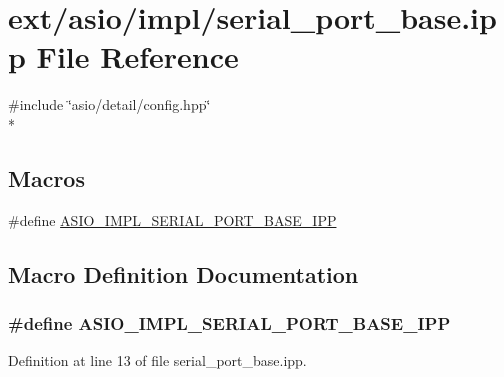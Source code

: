 \hypertarget{serial__port__base_8ipp}{}\section{ext/asio/impl/serial\+\_\+port\+\_\+base.ipp File Reference}
\label{serial__port__base_8ipp}
{\ttfamily \#include \char`\"{}asio/detail/config.\+hpp\char`\"{}}\\*
\subsection*{Macros}
\begin{DoxyCompactItemize}
\item 
\#define \hyperlink{serial__port__base_8ipp_ab15a9cac1d9640d965cf88420ea059c4}{A\+S\+I\+O\+\_\+\+I\+M\+P\+L\+\_\+\+S\+E\+R\+I\+A\+L\+\_\+\+P\+O\+R\+T\+\_\+\+B\+A\+S\+E\+\_\+\+I\+P\+P}
\end{DoxyCompactItemize}


\subsection{Macro Definition Documentation}
\hypertarget{serial__port__base_8ipp_ab15a9cac1d9640d965cf88420ea059c4}{}
\subsubsection[{A\+S\+I\+O\+\_\+\+I\+M\+P\+L\+\_\+\+S\+E\+R\+I\+A\+L\+\_\+\+P\+O\+R\+T\+\_\+\+B\+A\+S\+E\+\_\+\+I\+P\+P}]{\setlength{\rightskip}{0pt plus 5cm}\#define A\+S\+I\+O\+\_\+\+I\+M\+P\+L\+\_\+\+S\+E\+R\+I\+A\+L\+\_\+\+P\+O\+R\+T\+\_\+\+B\+A\+S\+E\+\_\+\+I\+P\+P}\label{serial__port__base_8ipp_ab15a9cac1d9640d965cf88420ea059c4}


Definition at line 13 of file serial\+\_\+port\+\_\+base.\+ipp.

